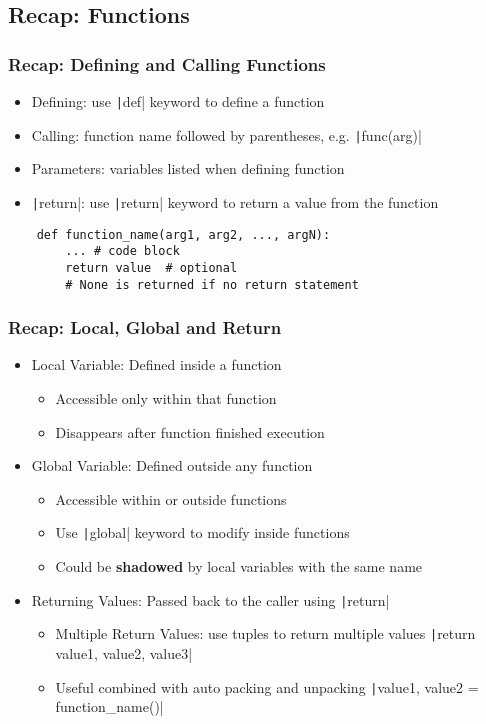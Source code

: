 \documentclass{beamer}
\newcommand{\python}[1]{\texttt|#1|}
\begin{document}
\subsection{Recap: Functions}
\begin{frame}[fragile]
    \frametitle{Recap: Defining and Calling Functions}
    \begin{itemize}
        \item Defining: use \python{def} keyword to define a function
        \item Calling: function name followed by parentheses, e.g. \python{func(arg)}
        \item Parameters: variables listed when defining function
        \item \python{return}: use \python{return} keyword to return a value from the function
    \end{itemize}
    \begin{verbatim}
    def function_name(arg1, arg2, ..., argN):
        ... # code block
        return value  # optional
        # None is returned if no return statement
    \end{verbatim}
\end{frame}
\begin{frame}
    \frametitle{Recap: Local, Global and Return}
    \begin{itemize}
        \item Local Variable: Defined inside a function
              \begin{itemize}
                  \item Accessible only within that function
                  \item Disappears after function finished execution
              \end{itemize}
        \item Global Variable: Defined outside any function
              \begin{itemize}
                  \item Accessible within or outside functions
                  \item Use \python{global} keyword to modify inside functions
                  \item Could be \textbf{shadowed} by local variables with the same name
              \end{itemize}
        \item Returning Values: Passed back to the caller using \python{return}
              \begin{itemize}
                  \item Multiple Return Values: use tuples to return multiple values
                        \python{return value1, value2, value3}
                  \item Useful combined with auto packing and unpacking
                        \python{value1, value2 = function_name()}
              \end{itemize}
    \end{itemize}
\end{frame}
\end{document}
